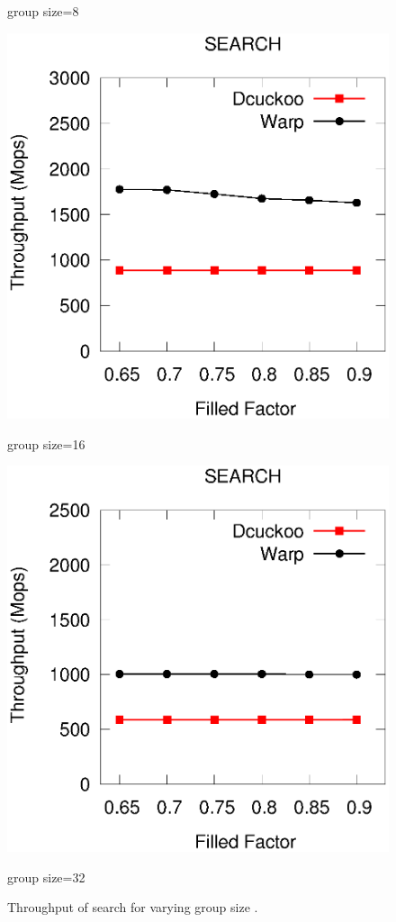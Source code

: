 \begin{figure}[htp]
\begin{minipage}{0.16\linewidth}
		\centerline{group size=8}	
		\end{minipage}
	\begin{minipage}{0.16\linewidth}\centering
		\includegraphics[width=\linewidth]{pic/group-size/g16-search.eps}
		\centerline{group size=16}
	\end{minipage}
	\begin{minipage}{0.16\linewidth}\centering
		\includegraphics[width=\linewidth]{pic/group-size/g32-search.eps}
		\centerline{group size=32}
	\end{minipage}
	\caption{Throughput of search for varying group size .}
	\label{fig:vary-upper-time}
\end{figure}
\fi



